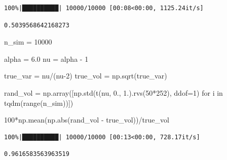 \documentclass[
  letterpaper,
]{report}
\newenvironment{Shaded}{\begin{snugshade}}{\end{snugshade}}
\newcommand{\BuiltInTok}[1]{\textcolor[rgb]{0.00,0.23,0.31}{#1}}
\newcommand{\ControlFlowTok}[1]{\textcolor[rgb]{0.00,0.23,0.31}{#1}}
\newcommand{\DecValTok}[1]{\textcolor[rgb]{0.68,0.00,0.00}{#1}}
\newcommand{\FloatTok}[1]{\textcolor[rgb]{0.68,0.00,0.00}{#1}}
\newcommand{\KeywordTok}[1]{\textcolor[rgb]{0.00,0.23,0.31}{#1}}
\newcommand{\NormalTok}[1]{\textcolor[rgb]{0.00,0.23,0.31}{#1}}
\newcommand{\OperatorTok}[1]{\textcolor[rgb]{0.37,0.37,0.37}{#1}}
\begin{document}
\begin{verbatim}
100%|██████████| 10000/10000 [00:08<00:00, 1125.24it/s]
\end{verbatim}

\begin{verbatim}
0.5039568642168273
\end{verbatim}

\begin{Shaded}
\begin{Highlighting}[]
\NormalTok{n\_sim }\OperatorTok{=} \DecValTok{10000}

\NormalTok{alpha }\OperatorTok{=} \FloatTok{6.0}
\NormalTok{nu }\OperatorTok{=}\NormalTok{ alpha }\OperatorTok{{-}} \DecValTok{1}

\NormalTok{true\_var }\OperatorTok{=}\NormalTok{ nu}\OperatorTok{/}\NormalTok{(nu}\OperatorTok{{-}}\DecValTok{2}\NormalTok{)}
\NormalTok{true\_vol }\OperatorTok{=}\NormalTok{ np.sqrt(true\_var)}

\NormalTok{rand\_vol }\OperatorTok{=}\NormalTok{ np.array([np.std(t(nu, }\FloatTok{0.}\NormalTok{, }\FloatTok{1.}\NormalTok{).rvs(}\DecValTok{50}\OperatorTok{*}\DecValTok{252}\NormalTok{), ddof}\OperatorTok{=}\DecValTok{1}\NormalTok{) }\ControlFlowTok{for}\NormalTok{ i }\KeywordTok{in}\NormalTok{ tqdm(}\BuiltInTok{range}\NormalTok{(n\_sim))])}

\DecValTok{100}\OperatorTok{*}\NormalTok{np.mean(np.}\BuiltInTok{abs}\NormalTok{(rand\_vol }\OperatorTok{{-}}\NormalTok{ true\_vol))}\OperatorTok{/}\NormalTok{true\_vol}
\end{Highlighting}
\end{Shaded}

\begin{verbatim}
100%|██████████| 10000/10000 [00:13<00:00, 728.17it/s]
\end{verbatim}

\begin{verbatim}
0.9616583563963519
\end{verbatim}
\end{document}
